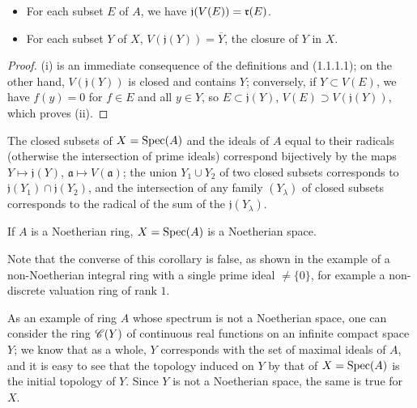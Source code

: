 \begin{prop}[1.1.4]
\label{prop-1.1.1.4}
\medskip\noindent
\begin{itemize}
  \item[{\rm(i)}] For each subset $E$ of $A$, we have $\mathfrak{j}(V(E))=\mathfrak{r}(E)$.
  \item[{\rm(ii)}] For each subset $Y$ of $X$, $V(\mathfrak{j}(Y))=\overline{Y}$, the closure
    of $Y$ in $X$.
\end{itemize}
\end{prop}

\begin{proof}
\label{proof-prop-1.1.1.4}
(i) is an immediate consequence of the definitions and (1.1.1.1); on the other hand,
$V(\mathfrak{j}(Y))$ is closed and contains $Y$; conversely, if $Y\subset V(E)$, we have
$f(y)=0$ for $f\in E$ and all $y\in Y$, so $E\subset\mathfrak{j}(Y)$,
$V(E)\supset V(\mathfrak{j}(Y))$, which proves (ii).
\end{proof}

\begin{cor}[1.1.5]
\label{cor-1.1.1.5}
The closed subsets of $X={\mathop{\mathrm{Spec}}\nolimits}(A)$ and the ideals of $A$ equal to their radicals (otherwise
the intersection of prime ideals) correspond bijectively by the  maps
$Y\mapsto\mathfrak{j}(Y)$, $\mathfrak{a}\mapsto V(\mathfrak{a})$; the union $Y_1\cup Y_2$ of
two closed subsets corresponds to $\mathfrak{j}(Y_1)\cap\mathfrak{j}(Y_2)$, and the
intersection of any family $(Y_\lambda)$ of closed subsets corresponds to the radical of the
sum of the $\mathfrak{j}(Y_\lambda)$.
\end{cor}

\begin{cor}[1.1.6]
\label{cor-1.1.1.6}
If $A$ is a Noetherian ring, $X={\mathop{\mathrm{Spec}}\nolimits}(A)$ is a Noetherian space.
\end{cor}

Note that the converse of this corollary is false, as shown
in the example of a non-Noetherian integral ring with a single prime ideal $\neq\{0\}$, for
example a non-discrete valuation ring of rank $1$.

As an example of ring $A$ whose spectrum is not a Noetherian space, one can consider the ring
$\mathscr{C}(Y)$ of continuous real functions on an infinite compact space $Y$; we know that as a
whole, $Y$ corresponds with the set of maximal ideals of $A$, and it is easy to see that the
topology induced on $Y$ by that of $X={\mathop{\mathrm{Spec}}\nolimits}(A)$ is the initial topology of $Y$. Since $Y$ is
not a Noetherian space, the same is true for $X$.

